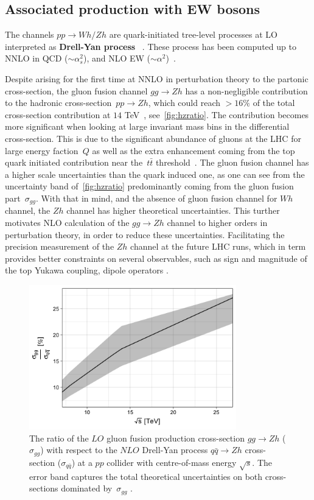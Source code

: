 \subsection{Associated production with EW bosons}
The channels $pp\to Wh/Zh$ are  quark-initiated tree-level processes at LO interpreted as \textbf{Drell-Yan process}~ \cite{Han:1991ia,Brein:2003wg}. These process has been computed up to  NNLO in QCD ($\sim \alpha_s^2$), and  NLO  EW  ($\sim \alpha^2 $)~\cite{Amoroso:2020lgh}.
\par Despite arising for the first time at NNLO in perturbation theory to the partonic cross-section, the gluon fusion channel $g g \rightarrow Zh$ has a non-negligible contribution to the hadronic cross-section~$pp\to Zh$, which could reach $>16\%$ of the total cross-section contribution at $14$ TeV~\cite{Cepeda:2019klc}, see~\autoref{fig:hzratio}. The contribution becomes more significant when looking at large invariant mass bins in the differential cross-section. This is due to the significant abundance of gluons at the LHC for large energy faction~$Q$ as well as the extra enhancement coming from the top quark initiated contribution near the~$t\bar t$ threshold~\cite{Englert:2013vua}.  The gluon fusion channel has a higher scale uncertainties than the quark induced one, as one can see from the uncertainty band of~\autoref{fig:hzratio} predominantly coming from the gluon fusion part~$\sigma_{gg}$.  With that in mind, and the absence of gluon fusion channel for $Wh$ channel, the $Zh$ channel has higher theoretical uncertainties. This turther motivates NLO calculation of the  $g g \rightarrow Z h$ channel to higher orders in perturbation theory,  in order to reduce these uncertainties. Facilitating the precision measurement of the $Zh$ channel at the future LHC runs, which in term provides better constraints on several observables, such as sign and magnitude of the top Yukawa coupling,  dipole operators \cite{Englert:2016hvy}.
\begin{figure}
	\begin{center}
		\includegraphics[width=9cm]{./figures/Rplot}
		\caption{The ratio of the $LO$ gluon fusion production cross-section $ gg \to Zh$  ($\sigma_{gg}$) with respect to the $NLO$ Drell-Yan process $ q\bar{q} \to Zh$ cross-section ($\sigma_{q\bar{q}}$) at a $pp$ collider with centre-of-mass energy $\sqrt{s}$. The error band captures the total theoretical uncertainties on both cross-sections dominated by~$\sigma_{gg}$ .}
		\label{fig:hzratio}
	\end{center}
\end{figure}
